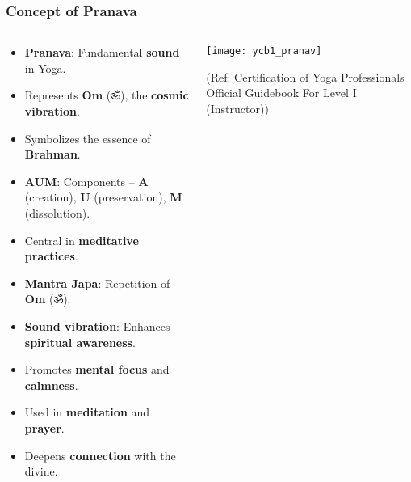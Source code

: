 \begin{frame}[fragile]\frametitle{Concept of Pranava}
\begin{columns}
    \begin{column}[T]{0.7\linewidth}
      \begin{itemize}
        \item \textbf{Pranava}: Fundamental \textbf{sound} in Yoga.
        \item Represents \textbf{Om} (ॐ), the \textbf{cosmic vibration}.
        \item Symbolizes the essence of \textbf{Brahman}.
        \item \textbf{AUM}: Components – \textbf{A} (creation), \textbf{U} (preservation), \textbf{M} (dissolution).
        \item Central in \textbf{meditative practices}.	  
        \item \textbf{Mantra Japa}: Repetition of \textbf{Om} (ॐ).
        \item \textbf{Sound vibration}: Enhances \textbf{spiritual awareness}.
        \item Promotes \textbf{mental focus} and \textbf{calmness}.
        \item Used in \textbf{meditation} and \textbf{prayer}.
        \item Deepens \textbf{connection} with the divine.
      \end{itemize}
    \end{column}
    \begin{column}[T]{0.3\linewidth}
        \begin{center}
        \texttt{[image: ycb1\_pranav]}

		{\tiny (Ref: Certification  of Yoga Professionals Official Guidebook For Level I (Instructor))}		
        \end{center}	
    \end{column}
\end{columns}
\end{frame}


